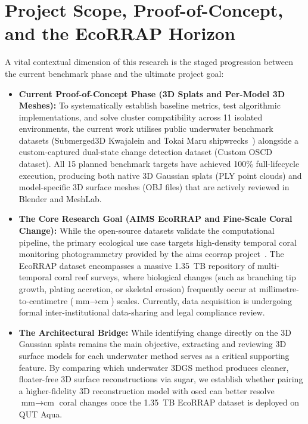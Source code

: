 \section{Project Scope, Proof-of-Concept, and the EcoRRAP Horizon}
\label{sec:scope_context}
A vital contextual dimension of this research is the staged progression between the current benchmark phase and the ultimate project goal:
\begin{itemize}
    \item \textbf{Current Proof-of-Concept Phase (3D Splats and Per-Model 3D Meshes):} To systematically establish baseline metrics, test algorithmic implementations, and solve cluster compatibility across 11 isolated environments, the current work utilises public underwater benchmark datasets (Submerged3D Kwajalein and Tokai Maru shipwrecks~\cite{11128502}) alongside a custom-captured dual-state change detection dataset (Custom OSCD dataset). All 15 planned benchmark targets have achieved 100\% full-lifecycle execution, producing both native 3D Gaussian splats (PLY point clouds) and model-specific 3D surface meshes (OBJ files) that are actively reviewed in Blender and MeshLab.
    \item \textbf{The Core Research Goal (AIMS EcoRRAP and Fine-Scale Coral Change):} While the open-source datasets validate the computational pipeline, the primary ecological use case targets high-density temporal coral monitoring photogrammetry provided by the \gls{aims} \gls{ecorrap} project~\cite{gordon2023field}. The EcoRRAP dataset encompasses a massive 1.35~TB repository of multi-temporal coral reef surveys, where biological changes (such as branching tip growth, plating accretion, or skeletal erosion) frequently occur at millimetre-to-centimetre ($\text{mm} \to \text{cm}$) scales. Currently, data acquisition is undergoing formal inter-institutional data-sharing and legal compliance review.
    \item \textbf{The Architectural Bridge:} While identifying change directly on the 3D Gaussian splats remains the main objective, extracting and reviewing 3D surface models for each underwater method serves as a critical supporting feature. By comparing which underwater 3DGS method produces cleaner, floater-free 3D surface reconstructions via \gls{sugar}, we establish whether pairing a higher-fidelity 3D reconstruction model with \gls{oscd} can better resolve $\text{mm} \to \text{cm}$ coral changes once the 1.35~TB EcoRRAP dataset is deployed on QUT Aqua.
\end{itemize}


